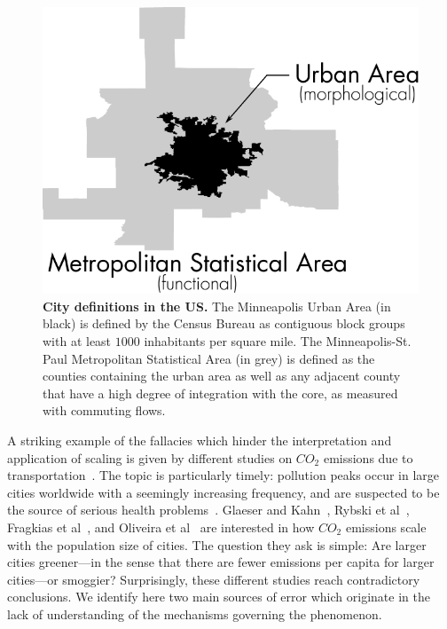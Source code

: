 \begin{figure}
    \centering
    \includegraphics[width=\textwidth]{gfx/chapter-scaling/city_definition.pdf}
    \caption{{\bf City definitions in the US.} The Minneapolis Urban Area (in
    black) is defined by the Census Bureau as contiguous block groups with at
least $1000$ inhabitants per square mile. The Minneapolis-St. Paul Metropolitan
Statistical Area (in grey) is defined as the counties containing the urban area
as well as any adjacent county that have a high degree of integration with the
core, as measured with commuting flows.\label{fig:two_definitions}}
\end{figure}

A striking example of the fallacies which hinder the interpretation and application
of scaling is given by different studies on $CO_2$ emissions due to transportation~\cite{Fragkias:2013,Glaeser:2010,Oliveira:2014,Rybski:2013}. The topic
is particularly timely: pollution peaks occur in large cities worldwide with a seemingly
increasing frequency, and are suspected to be the source of serious health problems~\cite{Bernstein:2004}. Glaeser and Kahn~\cite{Glaeser:2010}, Rybski et al~\cite{Rybski:2013}, Fragkias et al~\cite{Fragkias:2013}, and Oliveira et al~\cite{Oliveira:2014} are interested in how $CO_2$ emissions scale with the population size
of cities. The question they ask is simple: Are larger cities greener---in the sense that there
are fewer emissions per capita for larger cities---or smoggier? Surprisingly, these different
studies reach contradictory conclusions. We identify here two main sources of error which
originate in the lack of understanding of the mechanisms governing the phenomenon.

